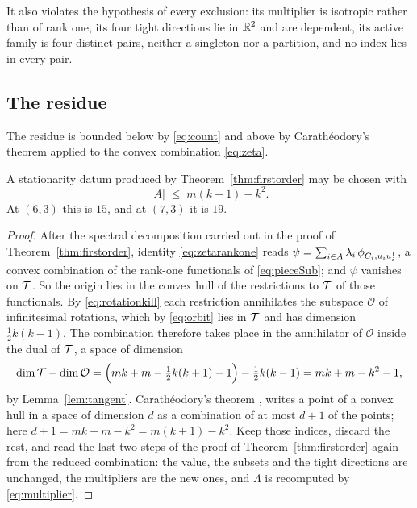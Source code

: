 It also violates the hypothesis of every exclusion: its multiplier is
isotropic rather than of rank one, its four tight directions lie in
$\mathbb{R}^2$ and are dependent, its active family is four distinct pairs,
neither a singleton nor a partition, and no index lies in every pair.

\subsection{The residue}\label{sec:census}

The residue is bounded below by \eqref{eq:count} and above by
Carath\'eodory's theorem applied to the convex combination
\eqref{eq:zeta}.

\begin{proposition}\label{prop:carath}
A stationarity datum produced by Theorem~\ref{thm:firstorder} may be
chosen with
\begin{equation}\label{eq:carath}
  \lvert A\rvert\;\le\;m(k+1)-k^{2} .
\end{equation}
At $(6,3)$ this is $15$, and at $(7,3)$ it is $19$.
\end{proposition}

\begin{proof}
After the spectral decomposition carried out in the proof of
Theorem~\ref{thm:firstorder}, identity \eqref{eq:zetarankone} reads
$\psi=\sum_{i\in A}\lambda_i\,\phi_{C_i,u_iu_i^{\mathsf{T}}}$, a convex
combination of the rank-one functionals of \eqref{eq:pieceSub}; and
$\psi$ vanishes on $\mathcal{T}$.  So the origin lies in the convex hull of the
restrictions to $\mathcal{T}$ of those functionals.  By \eqref{eq:rotationkill}
each restriction annihilates the subspace $\mathcal{O}$ of infinitesimal
rotations, which by \eqref{eq:orbit} lies in $\mathcal{T}$ and has dimension
$\tfrac12k(k-1)$.  The combination therefore takes place in the
annihilator of $\mathcal{O}$ inside the dual of $\mathcal{T}$, a space of dimension
\[
  \dim \mathcal{T}-\dim\mathcal{O}
  =\Bigl(mk+m-\tfrac12k(k+1)-1\Bigr)-\tfrac12k(k-1)
  =mk+m-k^{2}-1 ,
\]
by Lemma~\ref{lem:tangent}.  Carath\'eodory's theorem
\cite{Caratheodory1911}, \cite[\S17]{Rockafellar1970} writes a point of a
convex hull in a space of dimension $d$ as a combination of at most $d+1$
of the points; here $d+1=mk+m-k^{2}=m(k+1)-k^2$.  Keep those indices,
discard the rest, and read the last two steps of the proof of
Theorem~\ref{thm:firstorder} again from the reduced combination: the
value, the subsets and the tight directions are unchanged, the
multipliers are the new ones, and $\Lambda$ is recomputed by
\eqref{eq:multiplier}.
\end{proof}

